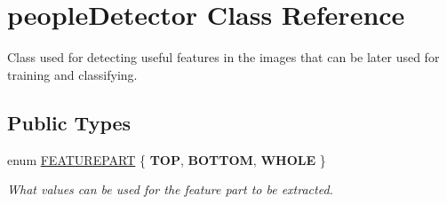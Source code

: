 \hypertarget{classpeopleDetector}{
\section{peopleDetector Class Reference}
\label{classpeopleDetector}
}


Class used for detecting useful features in the images that can be later used for training and classifying.  


\subsection*{Public Types}
\begin{DoxyCompactItemize}
\item 
enum \hyperlink{classpeopleDetector_a6ac98abe8ed7600f0db3fb04d718c27c}{FEATUREPART} \{ {\bfseries TOP}, 
{\bfseries BOTTOM}, 
{\bfseries WHOLE}
 \}
\begin{DoxyCompactList}\small\item\em What values can be used for the feature part to be extracted. \item\end{DoxyCompactList}\end{DoxyCompactItemize}
